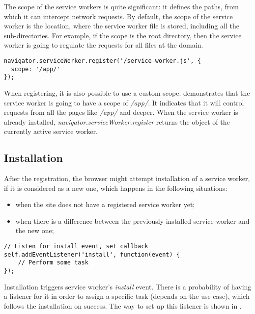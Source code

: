 The scope of the service workers is quite significant: it defines the paths, from which it can intercept network requests. By default, the scope of the service worker is the location, where the service worker file is stored, including all the sub-directories. For example, if the scope is the root directory, then the service worker is going to regulate the requests for all files at the domain.

\begin{lstlisting}[caption={[Code for setting up a custom scope of a Service Worker]Code, which demonstrates how to set a custom scope when registering a service worker\cite{32}.}, label={lst:tech2}]
navigator.serviceWorker.register('/service-worker.js', {
  scope: '/app/'
});
\end{lstlisting}

When registering, it is also possible to use a custom scope.  demonstrates that the service worker is going to have a scope of \textit{/app/}. It indicates that it will control requests from all the pages like \textit{/app/} and deeper. When the service worker is already installed, \textit{navigator.serviceWorker.register} returns the object of the currently active service worker.

\subsection*{Installation}

After the registration, the browser might attempt installation of a service worker, if it is considered as a new one, which happens in the following situations: 

\begin{itemize}
\item{when the site does not have a registered service worker yet;}
\item{when there is a difference between the previously installed service worker and the new one;}
\end{itemize}

\begin{lstlisting}[caption={[Code for listening to the installation of a Service Worker]Code, which demonstrates a listener for the \textit{install} service worker's event\cite{32}.}, label={lst:tech3}]
// Listen for install event, set callback
self.addEventListener('install', function(event) {
    // Perform some task
});
\end{lstlisting}

Installation triggers service worker's \textit{install} event. There is a probability of having a listener for it in order to assign a specific task (depends on the use case), which follows the installation on success. The way to set up this listener is shown in .

